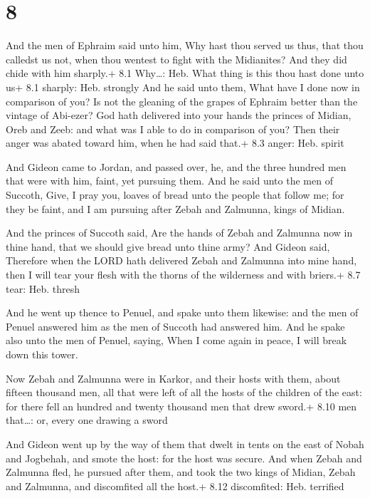 \hypertarget{section-7}{%
\section{8}\label{section-7}}

 And the men of Ephraim said unto him, Why hast thou served
us thus, that thou calledst us not, when thou wentest to fight with the
Midianites? And they did chide with him sharply.+ 8.1 Why\ldots: Heb.
What thing is this thou hast done unto us+ 8.1 sharply: Heb. strongly
 And he said unto them, What have I done now in comparison
of you? Is not the gleaning of the grapes of Ephraim better than the
vintage of Abi-ezer?  God hath delivered into your hands the
princes of Midian, Oreb and Zeeb: and what was I able to do in
comparison of you? Then their anger was abated toward him, when he had
said that.+ 8.3 anger: Heb. spirit

 And Gideon came to Jordan, and passed over, he, and the
three hundred men that were with him, faint, yet pursuing them.
 And he said unto the men of Succoth, Give, I pray you,
loaves of bread unto the people that follow me; for they be faint, and I
am pursuing after Zebah and Zalmunna, kings of Midian.

 And the princes of Succoth said, Are the hands of Zebah
and Zalmunna now in thine hand, that we should give bread unto thine
army?  And Gideon said, Therefore when the LORD hath
delivered Zebah and Zalmunna into mine hand, then I will tear your flesh
with the thorns of the wilderness and with briers.+ 8.7 tear: Heb.
thresh

 And he went up thence to Penuel, and spake unto them
likewise: and the men of Penuel answered him as the men of Succoth had
answered him.  And he spake also unto the men of Penuel,
saying, When I come again in peace, I will break down this tower.

 Now Zebah and Zalmunna were in Karkor, and their hosts
with them, about fifteen thousand men, all that were left of all the
hosts of the children of the east: for there fell an hundred and twenty
thousand men that drew sword.+ 8.10 men that\ldots: or, every one
drawing a sword

 And Gideon went up by the way of them that dwelt in
tents on the east of Nobah and Jogbehah, and smote the host: for the
host was secure.  And when Zebah and Zalmunna fled, he
pursued after them, and took the two kings of Midian, Zebah and
Zalmunna, and discomfited all the host.+ 8.12 discomfited: Heb.
terrified

